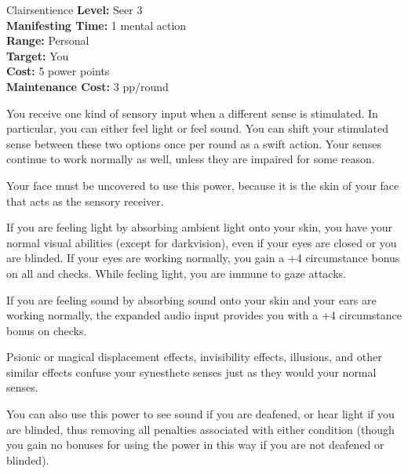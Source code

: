 {Clairsentience}
{
	\textbf{Level:}
	Seer 3\\
	\textbf{Manifesting Time:}
	1 mental action\\
	\textbf{Range:}
	Personal\\
	\textbf{Target:}
	You\\
	\textbf{Cost:}
	5 power points\\
	\textbf{Maintenance Cost:}
	3 pp/round\\
}
{
	You receive one kind of sensory input when a different sense is stimulated. In particular, you can either feel light or feel sound. You can shift your stimulated sense between these two options once per round as a swift action. Your senses continue to work normally as well, unless they are impaired for some reason.

	Your face must be uncovered to use this power, because it is the skin of your face that acts as the sensory receiver.

	If you are feeling light by absorbing ambient light onto your skin, you have your normal visual abilities (except for darkvision), even if your eyes are closed or you are blinded. If your eyes are working normally, you gain a +4 circumstance bonus on all  and  checks. While feeling light, you are immune to gaze attacks.

	If you are feeling sound by absorbing sound onto your skin and your ears are working normally, the expanded audio input provides you with a +4 circumstance bonus on  checks.

	Psionic or magical displacement effects, invisibility effects, illusions, and other similar effects confuse your synesthete senses just as they would your normal senses.

	You can also use this power to see sound if you are deafened, or hear light if you are blinded, thus removing all penalties associated with either condition (though you gain no bonuses for using the power in this way if you are not deafened or blinded).
}